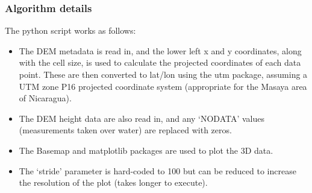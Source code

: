 \documentclass[10pt,a4paper]{article}
\begin{document}
\subsubsection{Algorithm details}
The python script works as follows:
\begin{itemize}
\item The DEM metadata is read in, and the lower left x and y coordinates, along with the cell size, is used to calculate the projected coordinates of each data point. These are then converted to lat/lon using the utm package, assuming a UTM zone P16 projected coordinate system (appropriate for the Masaya area of Nicaragua).
\item The DEM height data are also read in, and any `NODATA' values (measurements taken over water) are replaced with zeros.
\item The Basemap and matplotlib packages are used to plot the 3D data.
\item The `stride' parameter is hard-coded to 100 but can be reduced to increase the resolution of the plot (takes longer to execute).
\end{itemize}
\end{document}
